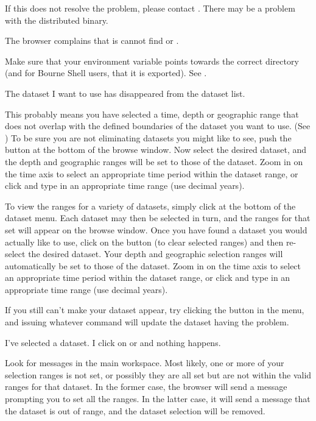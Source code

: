If this does not resolve the problem, please contact .  There may be
a problem with the distributed binary.

\problem The browser complains that is cannot find
 or .

\fix Make sure that your  environment variable
points towards the correct directory (and for Bourne Shell users, that
it is exported). See .

\problem The dataset I want to use has disappeared from
the dataset list.

\fix This probably means you have selected a time, depth or 
geographic range that does not overlap with the defined boundaries of
the dataset you want to use. (See ) To
be sure you are not eliminating datasets you might like to see, push
the  button at the bottom of the browse window.
Now select the desired dataset, and the depth and geographic ranges
will be set to those of the dataset.  Zoom in on the time axis to
select an appropriate time period within the dataset range, or click
 and type in an appropriate time range (use decimal
years).

To view the ranges for a variety of datasets,
simply click  at the bottom of the dataset menu.  Each
dataset may then be selected in turn, and the ranges for that set will
appear on the browse window.  Once you have found a dataset you would
actually like to use, click on the  button (to clear
selected ranges) and then re-select the desired dataset.  Your depth
and geographic selection ranges will automatically be set to those of
the dataset.  Zoom in on the time axis to select an appropriate time
period within the dataset range, or click  and type in an
appropriate time range (use decimal years).

If you still can't make your dataset appear, try clicking the
 button in the  menu, and
issuing whatever command will update the dataset having the
problem. 

\problem  I've selected a dataset.  I click on  or  and nothing happens.

\fix  Look for messages in the main workspace.  Most
likely, one or more of your selection ranges is not set, or possibly
they are all set but are not within the valid ranges for that dataset.
In the former case, the browser will send a message prompting you to
set all the ranges.  In the latter case, it will send a message that
the dataset is out of range, and the dataset selection will be
removed. 

